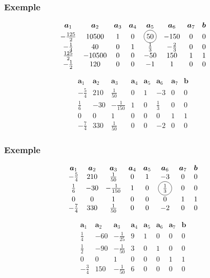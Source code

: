 \documentclass[usepdftitle=false]{beamer}
\newcommand*\circled[1]{\tikz[baseline=(char.base)]{
		\node[shape=circle,draw,inner sep=2pt] (char) {#1};}}
\def\ba{\boldsymbol{a}}
\def\bb{\boldsymbol{b}}
\begin{document}
\begin{frame}
\frametitle{Exemple}

\[
\begin{matrix}
\ba_1 & \ba_2 & \ba_3 & \ba_4 & \ba_5 &\ba_6 &\ba_7 & \bb \\
-\frac{125}{2} & 10500 & 1 & 0 & \circled{50} & -150 & 0 & 0 \\
-\frac{1}{4} & 40 & 0 & 1 & \frac{1}{3} & -\frac{2}{3} & 0 & 0 \\
\frac{125}{2} & -10500 & 0 & 0 & -50 & 150 & 1 & 1 \\
-\frac{1}{2} & 120 & 0 & 0 & -1 & 1 & 0 & 0
\end{matrix}
\]

\[
\begin{matrix}
\ba_1 & \ba_2 & \ba_3 & \ba_4 & \ba_5 &\ba_6 &\ba_7 & \bb \\
-\frac{5}{4} & 210 & \frac{1}{50} & 0 & 1 & -3 & 0 & 0 \\
\frac{1}{6} & -30 & -\frac{1}{150} & 1 & 0 & \frac{1}{3} & 0 & 0 \\
0 & 0 & 1 & 0 & 0 & 0 & 1 & 1 \\
-\frac{7}{4} & 330 & \frac{1}{50} & 0 & 0 & -2 & 0 & 0
\end{matrix}
\]

\end{frame}

\begin{frame}
\frametitle{Exemple}

\[
\begin{matrix}
\ba_1 & \ba_2 & \ba_3 & \ba_4 & \ba_5 &\ba_6 &\ba_7 & \bb \\
-\frac{5}{4} & 210 & \frac{1}{50} & 0 & 1 & -3 & 0 & 0 \\
\frac{1}{6} & -30 & -\frac{1}{150} & 1 & 0 & \circled{$\frac{1}{3}$} & 0 & 0 \\
0 & 0 & 1 & 0 & 0 & 0 & 1 & 1 \\
-\frac{7}{4} & 330 & \frac{1}{50} & 0 & 0 & -2 & 0 & 0
\end{matrix}
\]

\[
\begin{matrix}
\ba_1 & \ba_2 & \ba_3 & \ba_4 & \ba_5 &\ba_6 &\ba_7 & \bb \\
\frac{1}{4} & -60 & -\frac{1}{25} & 9 & 1 & 0 & 0 & 0 \\
\frac{1}{2} & -90 & -\frac{1}{50} & 3 & 0 & 1 & 0 & 0 \\
0 & 0 & 1 & 0 & 0 & 0 & 1 & 1 \\
-\frac{3}{4} & 150 & -\frac{1}{50} & 6 & 0 & 0 & 0 & 0
\end{matrix}
\]

\end{frame}
\end{document}
